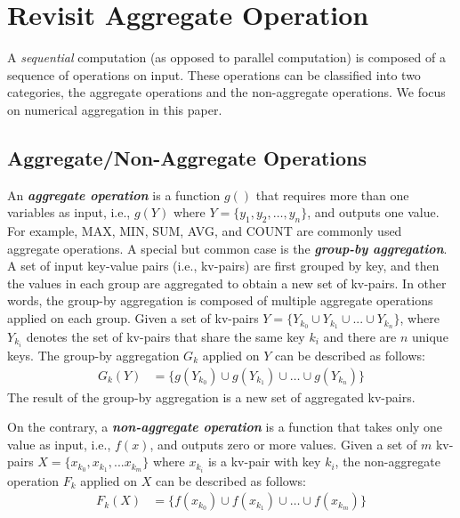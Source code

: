 \section{Revisit Aggregate Operation}
\label{sec:aggre}

A \emph{sequential} computation (as opposed to parallel computation) is composed of a sequence of operations on input. These operations can be classified into two categories, the aggregate operations and the non-aggregate operations. We focus on numerical aggregation in this paper.

\subsection{Aggregate/Non-Aggregate Operations}
An \emph{\textbf{aggregate operation}} is a function $g()$ that requires more than one variables as input, i.e., $g(Y)$ where $Y=\{y_1, y_2, \ldots, y_n\}$, and outputs one value. For example, MAX, MIN, SUM, AVG, and COUNT are commonly used aggregate operations. A special but common case is the \emph{\textbf{group-by aggregation}}. A set of input key-value pairs (i.e., kv-pairs) are first grouped by key, and then the values in each group are aggregated to obtain a new set of kv-pairs. In other words, the group-by aggregation is composed of multiple aggregate operations applied on each group. Given a set of kv-pairs $Y=\{Y_{k_0} \cup Y_{k_1} \cup ... \cup Y_{k_n}\}$, where $Y_{k_i}$ denotes the set of kv-pairs that share the same key $k_i$ and there are $n$ unique keys. The group-by aggregation $G_k$ applied on $Y$ can be described as follows:
\begin{equation}
	\begin{aligned}
	 G_k(Y)&=\{g(Y_{k_0}) \cup g(Y_{k_1}) \cup \dots \cup g(Y_{k_n})\}
 \end{aligned}
\end{equation}
The result of the group-by aggregation is a new set of aggregated kv-pairs.

On the contrary, a \emph{\textbf{non-aggregate operation}} is a function that takes only one value as input, i.e., $f(x)$, and outputs zero or more values. Given a set of $m$ kv-pairs $X=\{x_{k_0}, x_{k_1}, ... x_{k_m}\}$ where $x_{k_i}$ is a kv-pair with key $k_i$, the non-aggregate operation $F_k$ applied on $X$ can be described as follows:
\begin{equation}
	\begin{aligned}	
	F_k(X)&=\{f(x_{k_0}) \cup f(x_{k_1}) \cup \dots \cup f(x_{k_m})\}
	\end{aligned}
\end{equation}

